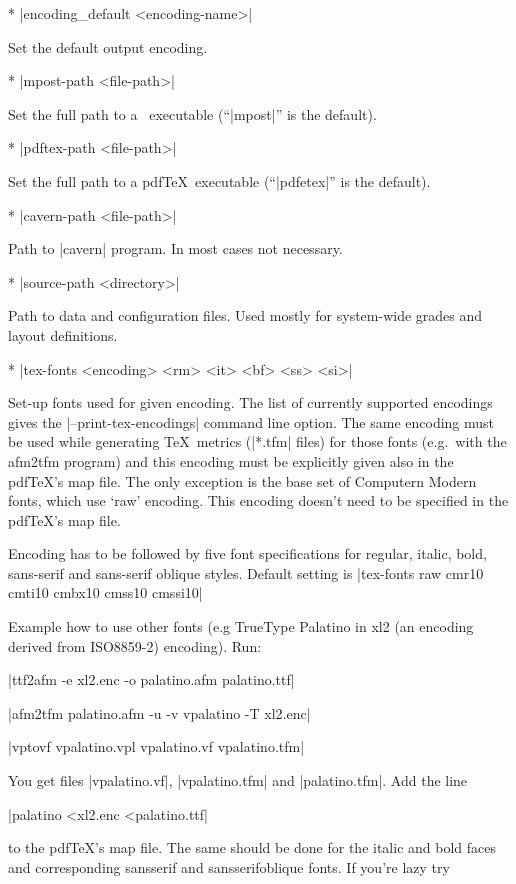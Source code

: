 \list
* |encoding_default <encoding-name>|

  Set the default output encoding.
        
* |mpost-path <file-path>|

  Set the full path to a \MP\ executable (``|mpost|'' is the default).

* |pdftex-path <file-path>|

  Set the full path to a pdf\TeX\ executable (``|pdfetex|'' is the default).

* |cavern-path <file-path>|

  Path to |cavern| program. In most cases not necessary.

* |source-path <directory>| 

  Path to data and configuration files. Used mostly for system-wide grades and 
  layout definitions.

* |tex-fonts <encoding> <rm> <it> <bf> <ss> <si>|
        
  Set-up fonts used for given encoding. The list of currently supported 
  encodings gives the |--print-tex-encodings| command line option.   
  The same encoding must be used while generating \TeX\ metrics (|*.tfm| files) 
  for those fonts (e.g.~with the afm2tfm program) and this encoding must be
  explicitly given also in the pdf\TeX's map file. The only exception is the 
  base set of Computern Modern fonts, which use `raw' encoding. This encoding
  doesn't need to be specified in the pdf\TeX's map file.
  
  Encoding has to be followed by five font specifications for regular, italic,
  bold, sans-serif and sans-serif oblique styles.
  Default setting is |tex-fonts raw cmr10 cmti10 cmbx10 cmss10 cmssi10|
  
  Example how to use other fonts (e.g TrueType Palatino in xl2 (an encoding 
  derived from ISO8859-2) encoding). Run:
  
  |ttf2afm -e xl2.enc -o palatino.afm palatino.ttf|
  
  |afm2tfm palatino.afm -u -v vpalatino -T xl2.enc|

  |vptovf vpalatino.vpl vpalatino.vf vpalatino.tfm|
  
  You get files |vpalatino.vf|, |vpalatino.tfm| and |palatino.tfm|. Add the line 
  
  |palatino <xl2.enc <palatino.ttf|
  
  to the pdf\TeX's map file. The same should be done for the italic and bold
  faces and corresponding sansserif and sansserifoblique fonts. If you're lazy
  try 
  
